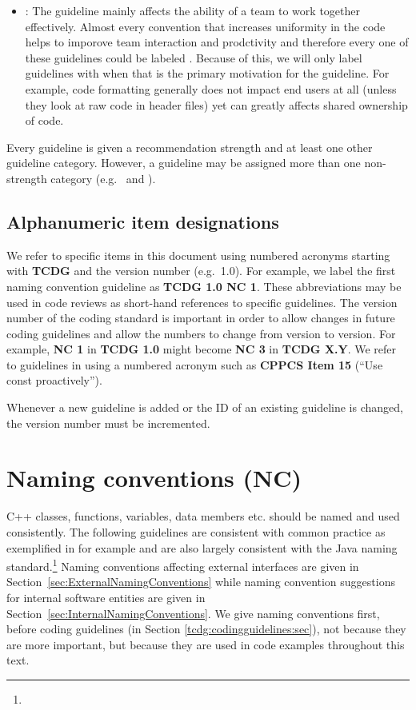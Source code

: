 \begin{itemize}
{}\item\textbf{\TeamGC}: The guideline mainly affects the ability of a
team to work together effectively.  Almost every convention that
increases uniformity in the code helps to imporove team interaction
and prodctivity and therefore every one of these guidelines could be
labeled {}\TeamGC{}.  Because of this, we will only label guidelines
with {}\TeamGC{} when that is the primary motivation for the
guideline.  For example, code formatting generally does not impact end
users at all (unless they look at raw code in header files) yet can
greatly affects shared ownership of code.

\end{itemize}

Every guideline is given a recommendation strength and at least one
other guideline category.  However, a guideline may be assigned more
than one non-strength category (e.g.\ \InteropGC{} and \SafetyGC).


%
\subsection{Alphanumeric item designations}
\label{sec:alpha_numeric_designations}
%

We refer to specific items in this document using numbered acronyms
starting with \textbf{TCDG} and the version number (e.g.\ 1.0).  For
example, we label the first naming convention guideline as
\textbf{TCDG 1.0 NC 1}.  These abbreviations may be used in code
reviews as short-hand references to specific guidelines.  The version
number of the coding standard is important in order to allow changes
in future coding guidelines and allow the numbers to change from
version to version.  For example, \textbf{NC 1} in \textbf{TCDG
  1.0} might become \textbf{NC 3} in \textbf{TCDG X.Y}.  We refer
to guidelines in \cite{C++CodingStandards05} using a numbered
acronym such as \textbf{CPPCS Item 15} (``Use const proactively'').

Whenever a new guideline is added or the ID of an existing guideline
is changed, the version number must be incremented.


%
\section{Naming conventions (NC)}
\label{sec:NamingConventions}
%

C++ classes, functions, variables, data members etc. should be named
and used consistently.  The following guidelines are consistent with
common practice as exemplified in {}\cite{EffectiveC++3rd05} for
example and are also largely consistent with the Java naming
standard.\footnote{
  {}}
Naming conventions affecting external interfaces are given in
Section~\ref{sec:ExternalNamingConventions} while naming convention
suggestions for internal software entities are given in
Section~\ref{sec:InternalNamingConventions}.  We give naming
conventions first, before coding guidelines (in Section
\ref{tcdg:codingguidelines:sec}), not because they are more important,
but because they are used in code examples throughout this text.


